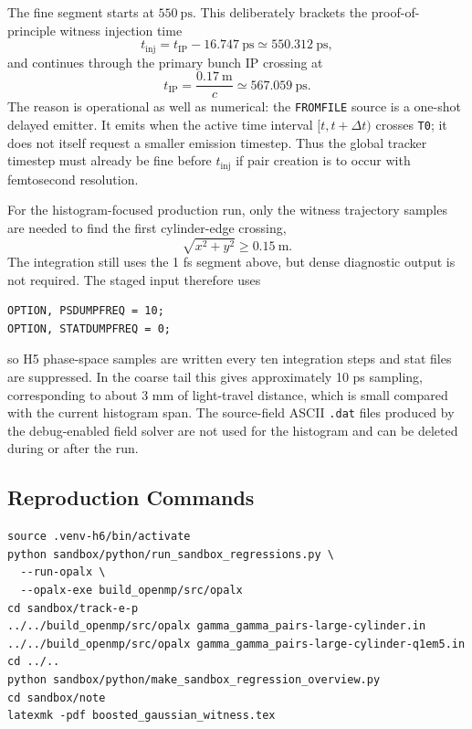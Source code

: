 \documentclass[11pt]{article}
\numberwithin{equation}{section}
\begin{document}
The fine segment starts at \(550~\mathrm{ps}\).  This deliberately brackets the
proof-of-principle witness injection time
\begin{equation}
  t_{\mathrm{inj}} =
  t_{\mathrm{IP}} - 16.747~\mathrm{ps}
  \simeq 550.312~\mathrm{ps},
\end{equation}
and continues through the primary bunch IP crossing at
\begin{equation}
  t_{\mathrm{IP}} = \frac{0.17~\mathrm{m}}{c}
  \simeq 567.059~\mathrm{ps}.
\end{equation}
The reason is operational as well as numerical: the \texttt{FROMFILE} source is
a one-shot delayed emitter.  It emits when the active time interval
\([t,t+\Delta t)\) crosses \texttt{T0}; it does not itself request a smaller
emission timestep.  Thus the global tracker timestep must already be fine
before \(t_{\mathrm{inj}}\) if pair creation is to occur with femtosecond
resolution.

For the histogram-focused production run, only the witness trajectory samples
are needed to find the first cylinder-edge crossing,
\begin{equation}
  \sqrt{x^2+y^2}\geq 0.15~\mathrm{m}.
\end{equation}
The integration still uses the 1 fs segment above, but dense diagnostic output
is not required.  The staged input therefore uses
\begin{verbatim}
OPTION, PSDUMPFREQ = 10;
OPTION, STATDUMPFREQ = 0;
\end{verbatim}
so H5 phase-space samples are written every ten integration steps and stat
files are suppressed.  In the coarse tail this gives approximately 10 ps
sampling, corresponding to about 3 mm of light-travel distance, which is small
compared with the current histogram span.  The source-field ASCII
\texttt{.dat} files produced by the debug-enabled field solver are not used for
the histogram and can be deleted during or after the run.

\subsection{Reproduction Commands}

\begin{verbatim}
source .venv-h6/bin/activate
python sandbox/python/run_sandbox_regressions.py \
  --run-opalx \
  --opalx-exe build_openmp/src/opalx
cd sandbox/track-e-p
../../build_openmp/src/opalx gamma_gamma_pairs-large-cylinder.in
../../build_openmp/src/opalx gamma_gamma_pairs-large-cylinder-q1em5.in
cd ../..
python sandbox/python/make_sandbox_regression_overview.py
cd sandbox/note
latexmk -pdf boosted_gaussian_witness.tex
\end{verbatim}
\end{document}
